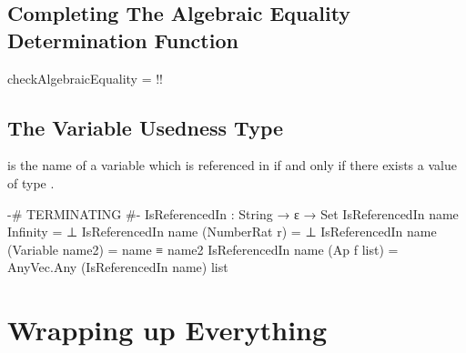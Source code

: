 \documentclass{report}
\begin{document}
\section{Completing The Algebraic Equality Determination Function}

\begin{code}
checkAlgebraicEquality = {!!}
\end{code}

\section{The Variable Usedness Type}
 is the name of a variable which is referenced in  if and only if there exists a value of type   .

\begin{code}
{-# TERMINATING #-}
IsReferencedIn : String → ε → Set
IsReferencedIn name Infinity = ⊥
IsReferencedIn name (NumberRat r) = ⊥
IsReferencedIn name (Variable name2) = name ≡ name2
IsReferencedIn name (Ap f list) = AnyVec.Any (IsReferencedIn name) list
\end{code}

\chapter{Wrapping up Everything}
\end{document}
